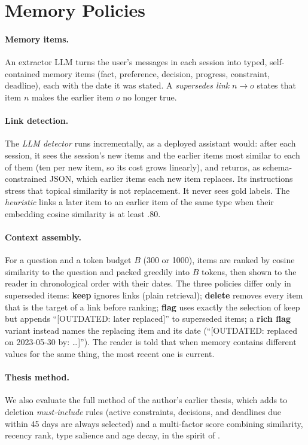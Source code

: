 \documentclass[11pt]{article}
\begin{document}
\section{Memory Policies}
\label{sec:method}

\paragraph{Memory items.} An extractor LLM turns the user's messages in each session into typed,
self-contained memory items (fact, preference, decision, progress, constraint, deadline), each with
the date it was stated. A \emph{supersedes link} $n \rightarrow o$ states that item $n$ makes the
earlier item $o$ no longer true.

\paragraph{Link detection.} The \emph{LLM detector} runs incrementally, as a deployed assistant
would: after each session, it sees the session's new items and the earlier items most similar to
each of them (ten per new item, so its cost grows linearly), and returns, as schema-constrained
JSON, which earlier items each new item replaces. Its instructions stress that topical similarity is
not replacement. It never sees gold labels. The \emph{heuristic} links a later item to an earlier
item of the same type when their embedding cosine similarity
\citep[all-MiniLM-L6-v2;][]{reimers2019sbert} is at least .80.

\paragraph{Context assembly.} For a question and a token budget $B$ (300 or 1000), items are ranked by
cosine similarity to the question and packed greedily into $B$ tokens, then shown to the reader in
chronological order with their dates. The three policies differ only in superseded items:
\textbf{keep} ignores links (plain retrieval); \textbf{delete} removes every item that is the target
of a link before ranking; \textbf{flag} uses exactly the selection of keep but appends
``[OUTDATED: later replaced]'' to superseded items; a \textbf{rich flag} variant instead names the
replacing item and its date (``[OUTDATED: replaced on 2023-05-30 by: \ldots]''). The reader is told that when memory contains
different values for the same thing, the most recent one is current.

\paragraph{Thesis method.} We also evaluate the full method of the author's earlier thesis, which
adds to deletion \emph{must-include} rules (active constraints, decisions, and deadlines due within
45 days are always selected) and a multi-factor score combining similarity, recency rank, type
salience and age decay, in the spirit of \citet{park2023generative}.
\end{document}
